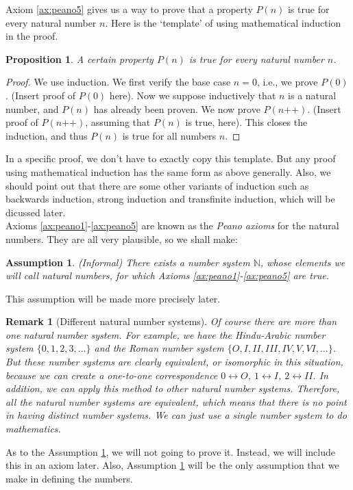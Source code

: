 \documentclass[a4paper]{book}
\newtheorem*{proof}{\textit{Proof.}}
\theoremstyle{break}
\newtheorem{assumption}{Assumption}[chapter]
\newtheorem{remark}{Remark}[section]
\newtheorem{proposition}{Proposition}[section]
\begin{document}
			Axiom \ref{ax:peano5} gives us a way to prove that a property $P(n)$ is true for every natural number $n$. Here is the `template' of using mathematical induction in the proof.
			\begin{proposition}
				A certain property $P(n)$ is true for every natural number $n$.
			\end{proposition}
			\begin{proof}
				We use induction. We first verify the base case $n=0$, i.e., we prove $P(0)$. (Insert proof of $P(0)$ here). Now we suppose inductively that $n$ is a natural number, and $P(n)$ has already been proven. We now prove $P(n\texttt{++})$. (Insert proof of $P(n \texttt{++})$, assuming that $P(n)$ is true, here). This closes the induction, and thus $P(n)$ is true for all numbers $n$.
			\end{proof}
			In a specific proof, we don't have to exactly copy this template. But any proof using mathematical induction has the same form as above generally. Also, we should point out that there are some other variants of induction such as backwards induction, strong induction and transfinite induction, which will be dicussed later.\\
			Axioms \ref{ax:peano1}-\ref{ax:peano5} are known as the \textit{Peano axioms} for the natural numbers. They are all very plausible, so we shall make:
			\begin{assumption}
				\label{assumption1}
				(Informal) There exists a number system $\mathbb{N}$, whose elements we will call natural numbers, for which Axioms \ref{ax:peano1}-\ref{ax:peano5} are true.
			\end{assumption}
			This assumption will be made more precisely later.
			\begin{remark}[Different natural number systems]
				Of course there are more than one natural number system. For example, we have the Hindu-Arabic number system $\{0,1,2,3,...\}$ and the Roman number system $\{O,I,I\!I,I\!I\!I,I\!V,V,V\!I,...\}$. But these number systems are clearly equivalent, or isomorphic in this situation, because we can create a one-to-one correspondence $0\leftrightarrow O$, $1\leftrightarrow I$, $2\leftrightarrow I\!I$. In addition, we can apply this method to other natural number systems. Therefore, all the natural number systems are equivalent, which means that there is no point in having distinct number systems. We can just use a single number system to do mathematics.
			\end{remark}
			As to the Assumption \ref{assumption1}, we will not going to prove it. Instead, we will include this in an axiom later. Also, Assumption \ref{assumption1} will be the only assumption that we make in defining the numbers.
\end{document}
